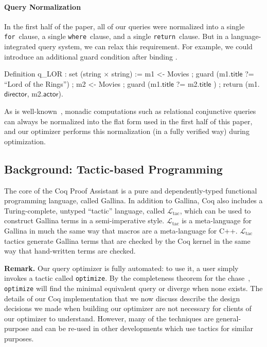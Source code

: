 \documentclass[preprint]{sigplanconf}
\newcommand{\FOR}{{\tt for}\relax\ifmmode\ \else\xspace\fi}
\newcommand{\WHERE}{{\tt where}\relax\ifmmode\ \else\xspace\fi}
\newcommand{\RETURN}{{\tt return}\relax\ifmmode\ \else\xspace\fi}
\newcommand{\greg}[1]{\textcolor{blue}{GREG: #1}}
\newcommand{\ltac}[0]{\ensuremath{\mathcal{L}_{\mathrm{tac}}}}
\begin{document}




\paragraph{Query Normalization}
In the first half of the paper, all of our queries were normalized into a single \FOR clause, a single \WHERE clause, and a single \RETURN clause.  But in a language-integrated query system, we can relax this requirement.  For example, we could introduce an additional guard condition after binding .
\begin{coq}
Definition q_LOR : set (string $\times$ string) :=
  m1 <- Movies ;
  guard (m1.$\textsf{title}$ ?= ``Lord of the Rings'') ;
  m2 <- Movies ;
  guard (m1.$\textsf{title}$ ?= m2.$\textsf{title}$ ) ;
  return (m1.$\textsf{director}$, m2.$\textsf{actor}$).
\end{coq}
As is well-known~\cite{monad}, monadic computations such as relational conjunctive queries can always be normalized into the flat form used in the first half of this paper, and our optimizer performs this normalization (in a fully verified way) during optimization.


\subsection{Background: Tactic-based Programming}
\label{sec:tactic-based}

The core of the Coq Proof Assistant is a pure and dependently-typed functional programming language, called Gallina.  In addition to Gallina, Coq also includes a Turing-complete, untyped ``tactic'' language, called \ltac{}, which can be used to construct Gallina terms in a semi-imperative style. 
\ltac{} is a meta-language for Gallina in much the same way that macros are a meta-language for C++.
\ltac{} tactics generate Gallina terms that are checked by the Coq kernel in the same way that hand-written terms are checked.

\textbf{Remark.}
Our query optimizer is fully automated: to use it, a user simply invokes a tactic called {\tt optimize}.
By the completeness theorem for the chase~\cite{Popa99anequational}, {\tt optimize} will find the minimal equivalent query or diverge when none exists.  The details of our Coq implementation that we now discuss describe the design decisions we made when building our optimizer are not necessary for clients of our optimizer to understand.
However, many of the techniques are general-purpose and can be re-used in other developments which use tactics for similar purposes.
\end{document}
